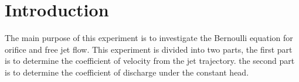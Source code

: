 \section{Introduction}
\label{sec:introduction}
\FloatBarrier %
The main purpose of this experiment is to investigate the Bernoulli equation for orifice and free jet flow.
This experiment is divided into two parts, the first part is to determine the coefficient of velocity from the jet trajectory.
the second part is to determine the coefficient of discharge under the constant head.
